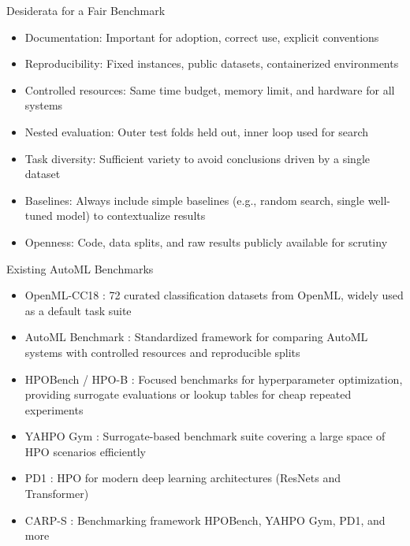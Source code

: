 \documentclass[main]{subfiles}
\begin{document}
\begin{frame}{Desiderata for a Fair Benchmark}
    \begin{itemize}
        \item Documentation: Important for adoption, correct use, explicit conventions
        \item Reproducibility: Fixed instances, public datasets, containerized environments
        \item Controlled resources: Same time budget, memory limit, and hardware for all systems
        \item Nested evaluation: Outer test folds held out, inner loop used for search
        \item Task diversity: Sufficient variety to avoid conclusions driven by a single dataset
        \item Baselines: Always include simple baselines (e.g., random search, single well-tuned model) to contextualize results
        \item Openness: Code, data splits, and raw results publicly available for scrutiny
    \end{itemize}
\end{frame}

\begin{frame}{Existing AutoML Benchmarks}
    \begin{itemize}
        \item OpenML-CC18 : 72 curated classification datasets from OpenML, widely used as a default task suite
        \item AutoML Benchmark : Standardized framework for comparing AutoML systems with controlled resources and reproducible splits
        \item HPOBench / HPO-B : Focused benchmarks for hyperparameter optimization, providing surrogate evaluations or lookup tables for cheap repeated experiments
        \item YAHPO Gym : Surrogate-based benchmark suite covering a large space of HPO scenarios efficiently
        \item PD1 : HPO for modern deep learning architectures (ResNets and Transformer)
        \item CARP-S : Benchmarking framework   HPOBench, YAHPO Gym, PD1, and more
    \end{itemize}
\end{frame}
\end{document}
